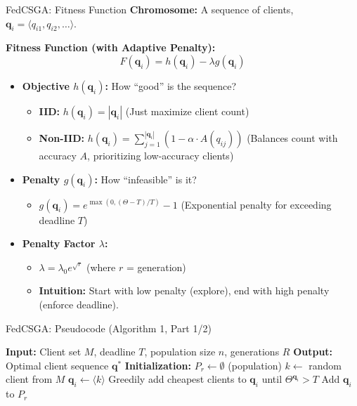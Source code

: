 \documentclass{beamer}
\begin{document}
\begin{frame}{FedCSGA: Fitness Function}
\textbf{Chromosome:} A sequence of clients, $\mathbf{q}_i = \langle q_{i1}, q_{i2}, \ldots \rangle$.

\textbf{Fitness Function (with Adaptive Penalty):}
$$ F(\mathbf{q}_i) = h(\mathbf{q}_i) - \lambda g(\mathbf{q}_i) $$

\begin{itemize}
    \item \textbf{Objective $h(\mathbf{q}_i)$:} How ``good'' is the sequence?
        \begin{itemize}
            \item \textbf{IID:} $h(\mathbf{q}_i) = |\mathbf{q}_i|$ (Just maximize client count)
            \item \textbf{Non-IID:} $h(\mathbf{q}_i) = \sum_{j=1}^{|\mathbf{q}_i|} (1 - \alpha \cdot A(q_{ij}))$
            (Balances count with accuracy $A$, prioritizing low-accuracy clients)
        \end{itemize}
    
    \item \textbf{Penalty $g(\mathbf{q}_i)$:} How ``infeasible'' is it?
        \begin{itemize}
            \item $g(\mathbf{q}_i) = e^{\max(0, (\Theta - T)/T)} - 1$ (Exponential penalty for exceeding deadline $T$)
        \end{itemize}

    \item \textbf{Penalty Factor $\lambda$:}
        \begin{itemize}
            \item $\lambda = \lambda_0 e^{\sqrt{r}}$ (where $r$ = generation)
            \item \textbf{Intuition:} Start with low penalty (explore), end with high penalty (enforce deadline).
        \end{itemize}
\end{itemize}
\end{frame}


\begin{frame}[fragile]{FedCSGA: Pseudocode (Algorithm 1, Part 1/2)}
\begin{algorithmic}[1]
\scriptsize
\STATE \textbf{Input:} Client set $M$, deadline $T$, population size $n$, generations $R$
\STATE \textbf{Output:} Optimal client sequence $\mathbf{q}^*$
\STATE \textbf{Initialization:}
\STATE $P_r \leftarrow \emptyset$ (population)
    \STATE $k \leftarrow$ random client from $M$
    \STATE $\mathbf{q}_i \leftarrow \langle k \rangle$
    \STATE Greedily add cheapest clients to $\mathbf{q}_i$ until $\Theta^{\mathbf{q}_i} > T$
    \STATE Add $\mathbf{q}_i$ to $P_r$
\ENDFOR
\end{algorithmic}
\end{frame}
\end{document}
